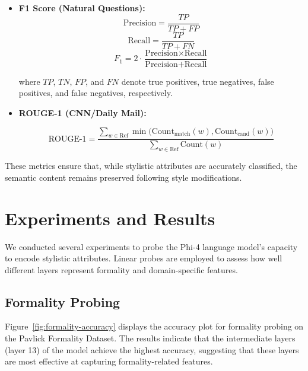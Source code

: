 \documentclass[twocolumn]{article}
\begin{document}
\begin{itemize}
    \item \textbf{F1 Score (Natural Questions):}
        \begin{equation}
            \text{Precision} = \frac{TP}{TP + FP}
        \end{equation}
        \begin{equation}
            \text{Recall} = \frac{TP}{TP + FN}
        \end{equation}
        \begin{equation}
            \text{$F_1$} = 2 \cdot \frac{\text{Precision} \times \text{Recall}}{\text{Precision} + \text{Recall}}
        \end{equation}

    where $TP$, $TN$, $FP$, and $FN$ denote true positives, true negatives, false positives, and false negatives, respectively.



    \item \textbf{ROUGE-1 (CNN/Daily Mail):}

        {\small
        \begin{equation}
            \text{ROUGE-1} =
            \frac{
              \sum_{w \in \text{Ref}}
              \min\!\bigl(\text{Count}_{\text{match}}(w), \text{Count}_{\text{cand}}(w)\bigr)
            }{
              \sum_{w \in \text{Ref}}
              \text{Count}(w)
            }
        \end{equation}
        \normalsize}

\end{itemize}

These metrics ensure that, while stylistic attributes are accurately classified, the semantic content remains preserved following style modifications.


\section{Experiments and Results}
We conducted several experiments to probe the Phi-4 language model's capacity to encode stylistic attributes. Linear probes are employed to assess how well different layers represent formality and domain-specific features.


\subsection{Formality Probing}

Figure~\ref{fig:formality-accuracy} displays the accuracy plot for formality probing on the Pavlick Formality Dataset. The results indicate that the intermediate layers (layer 13) of the model achieve the highest accuracy, suggesting that these layers are most effective at capturing formality-related features.
\end{document}
